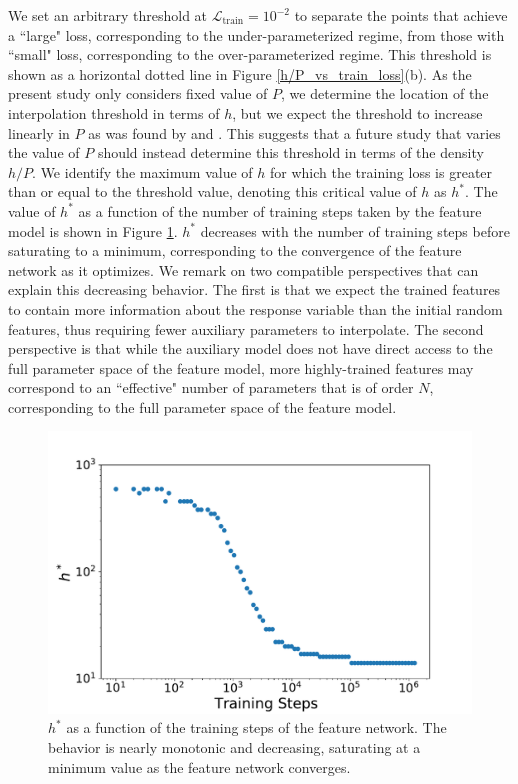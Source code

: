\documentclass[11pt]{article}
\begin{document}
We set an arbitrary threshold at $\mathcal L_\text{train} = 10^{-2}$ to separate the points that achieve a ``large" loss, corresponding to the under-parameterized regime, from those with ``small" loss, corresponding to the over-parameterized regime. This threshold is shown as a horizontal dotted line in Figure \ref{h/P_vs_train_loss}(b). As the present study only considers fixed value of $P$, we determine the location of the interpolation threshold in terms of $h$, but we expect the threshold to increase linearly in $P$ as was found by \cite{geigerJammingTransitionParadigm2019} and \cite{spiglerJammingTransitionOverparametrization2019}. This suggests that a future study that varies the value of $P$ should instead determine this threshold in terms of the density $h/P$. We identify the maximum value of $h$ for which the training loss is greater than or equal to the threshold value, denoting this critical value of $h$ as $h^*$. The value of $h^*$ as a function of the number of training steps taken by the feature model is shown in Figure \ref{h^*_vs_t}. $h^*$ decreases with the number of training steps before saturating to a minimum, corresponding to the convergence of the feature network as it optimizes. We remark on two compatible perspectives that can explain this decreasing behavior. The first is that we expect the trained features to contain more information about the response variable than the initial random features, thus requiring fewer auxiliary parameters to interpolate. The second perspective is that while the auxiliary model does not have direct access to the full parameter space of the feature model, more highly-trained features may correspond to an ``effective" number of parameters that is of order $N$, corresponding to the full parameter space of the feature model.\\

\begin{figure}[!h]
\centering
\captionsetup{width=.8\linewidth}
\includegraphics[width=.8\linewidth]{docs/assets/h_star_vs_train_steps_L=1.pdf}
\caption{$h^*$ as a function of the training steps of the feature network. The behavior is nearly monotonic and decreasing, saturating at a minimum value as the feature network converges.}
\label{h^*_vs_t}
\end{figure}
\end{document}
